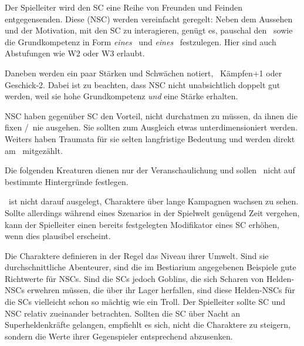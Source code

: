 {	

		\noindent
		Der Spielleiter wird den SC eine Reihe von Freunden und Feinden entgegensenden. Diese  (NSC) werden vereinfacht geregelt: Neben dem Aussehen und der Motivation, mit den SC zu interagieren, genügt es, pauschal den \HD\ sowie die Grundkompetenz in Form \emph{eines} \AD\ und \emph{eines} \RD\ festzulegen. Hier sind auch Abstufungen wie W2 oder W3 erlaubt.

		\nipajinTableNSC

		\noindent
		Daneben werden ein paar Stärken und Schwächen notiert, \zB\ Kämpfen+1 oder Geschick-2. Dabei ist zu beachten, dass NSC nicht unabsichtlich doppelt gut werden, weil sie hohe Grundkompetenz \emph{und} eine Stärke erhalten.

		NSC haben gegenüber SC den Vorteil, nicht durchatmen zu müssen, da ihnen die fixen \AD/\RD\ nie ausgehen. Sie sollten zum Ausgleich etwas unterdimensioniert werden. Weiters haben Traumata für sie selten langfristige Bedeutung und werden direkt am \HD\ mitgezählt.


		\noindent
		Die folgenden Kreaturen dienen nur der Veranschaulichung und sollen \nipajin\ nicht auf bestimmte Hintergründe festlegen.

		\nipajinTableBestiary


		\noindent
		\nipajin\ ist nicht darauf ausgelegt, Charaktere über lange Kampagnen wachsen zu sehen. Sollte allerdings während eines Szenarios in der Spielwelt genügend Zeit vergehen, kann der Spielleiter einen bereits festgelegten Modifikator eines SC erhöhen, wenn dies plausibel erscheint.

		Die Charaktere definieren in der Regel das Niveau ihrer Umwelt. Sind sie durchschnittliche Abenteurer, sind die im Bestiarium angegebenen Beispiele gute Richtwerte für NSCs. Sind die SCs jedoch Goblins, die sich Scharen von Helden-NSCs erwehren müssen, die über ihr Lager herfallen, sind diese Helden-NSCs für die SCs vielleicht schon so mächtig wie ein Troll. Der Spielleiter sollte SC und NSC relativ zueinander betrachten. Sollten die SC über Nacht an Super\-hel\-den\-kräfte gelangen, empfiehlt es sich, nicht die Charaktere zu steigern, sondern die Werte ihrer Gegenspieler entsprechend abzusenken.
}
